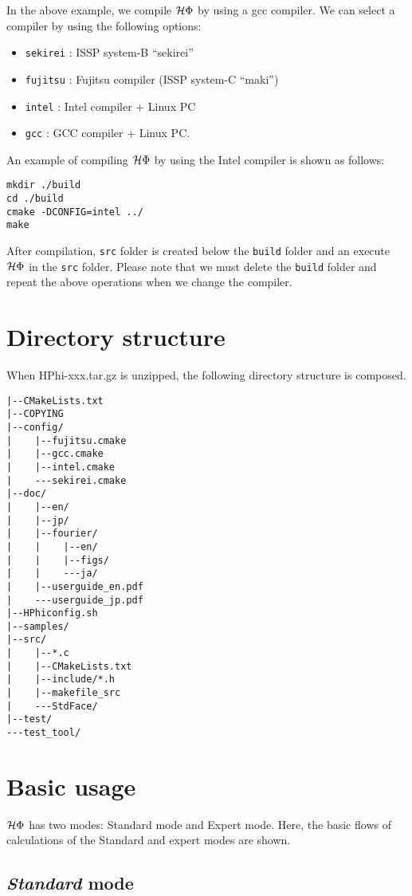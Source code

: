 In the above example,
we compile $\mathcal{H} \Phi$ by using a gcc compiler.
We can select a compiler by using the following options:
\begin{itemize}
\item \verb|sekirei| : ISSP system-B ``sekirei''
\item \verb|fujitsu| : Fujitsu compiler (ISSP system-C ``maki'')
\item \verb|intel| : Intel compiler + Linux PC
\item \verb|gcc| : GCC compiler + Linux PC.
\end{itemize}
An example of compiling $\mathcal{H} \Phi$ by using the Intel compiler is shown as follows:
\begin{verbatim}
mkdir ./build
cd ./build
cmake -DCONFIG=intel ../
make
\end{verbatim}
After compilation,
\verb|src| folder is created below the \verb|build| folder and
an execute $\mathcal{H} \Phi$ in the \verb|src| folder.
Please note that we must delete the \verb|build| folder and
repeat the above operations when we change the compiler.

\label{Sec:HowToInstall}

\section{Directory structure}
When HPhi-xxx.tar.gz is unzipped, the following directory structure is composed.
 
\begin{verbatim}
|--CMakeLists.txt
|--COPYING
|--config/
|    |--fujitsu.cmake
|    |--gcc.cmake
|    |--intel.cmake
|    ---sekirei.cmake
|--doc/
|    |--en/
|    |--jp/
|    |--fourier/
|    |    |--en/
|    |    |--figs/
|    |    ---ja/
|    |--userguide_en.pdf
|    ---userguide_jp.pdf
|--HPhiconfig.sh
|--samples/
|--src/
|    |--*.c
|    |--CMakeLists.txt
|    |--include/*.h
|    |--makefile_src
|    ---StdFace/
|--test/
---test_tool/
\end{verbatim}

\section{Basic usage}
$\mathcal{H} \Phi$ has two modes: Standard mode and Expert mode.
Here, the basic flows of calculations of the Standard and expert modes are shown.

\subsection{{\it Standard} mode}

